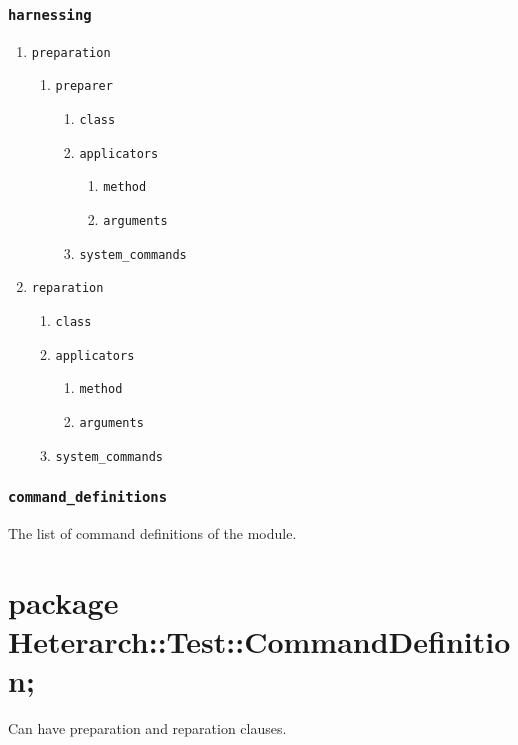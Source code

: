 \documentclass[11pt]{article}
\begin{document}
\subsubsection{\texttt{harnessing}}
\label{sec-2-1-1}
\begin{enumerate}
\item \texttt{preparation}
\label{sec-2-1-1-1}
\begin{enumerate}
\item \texttt{preparer}
\label{sec-2-1-1-1-1}
\begin{enumerate}
\item \texttt{class}
\label{sec-2-1-1-1-1-1}
\item \texttt{applicators}
\label{sec-2-1-1-1-1-2}
\begin{enumerate}
\item \texttt{method}
\label{sec-2-1-1-1-1-2-1}
\item \texttt{arguments}
\label{sec-2-1-1-1-1-2-2}
\end{enumerate}
\item \texttt{system\_commands}
\label{sec-2-1-1-1-1-3}
\end{enumerate}
\end{enumerate}

\item \texttt{reparation}
\label{sec-2-1-1-2}
\begin{enumerate}
\item \texttt{class}
\label{sec-2-1-1-2-0-1}
\item \texttt{applicators}
\label{sec-2-1-1-2-0-2}
\begin{enumerate}
\item \texttt{method}
\label{sec-2-1-1-2-0-2-1}
\item \texttt{arguments}
\label{sec-2-1-1-2-0-2-2}
\end{enumerate}
\item \texttt{system\_commands}
\label{sec-2-1-1-2-0-3}
\end{enumerate}
\end{enumerate}

\subsubsection{\texttt{command\_definitions}}
\label{sec-2-1-2}
The list of command definitions of the module.


\section{package Heterarch::Test::CommandDefinition;}
\label{sec-3}
Can have preparation and reparation clauses.
\end{document}
